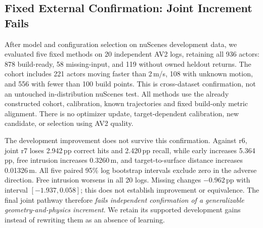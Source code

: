 \subsection{Fixed External Confirmation: Joint Increment Fails}
\label{sec:external}
After model and configuration selection on nuScenes development data, we evaluated five fixed methods on 20 independent AV2 logs, retaining all 936 actors: 878 build-ready, 58 missing-input, and 119 without owned heldout returns. The cohort includes 221 actors moving faster than 2\,m/s, 108 with unknown motion, and 556 with fewer than 100 build points. This is cross-dataset confirmation, not an untouched in-distribution nuScenes test. All methods use the already constructed cohort, calibration, known trajectories and fixed build-only metric alignment. There is no optimizer update, target-dependent calibration, new candidate, or selection using AV2 quality.

\begin{table}[t]
\centering\small
\caption{Final fixed AV2 actor confirmation, 20 equally weighted logs. Hit/early/miss/recall are percentages; free and distance are meters. All 936 actor entries remain in accounting, including missing inputs and undefined owned-return cases. Distance is directed and conditional, not dense ground-truth Chamfer. Joint r7 and LiDAR r6 share the surface and physical objective; the joint pathway also changes native seeds, DPT features and build-depth auxiliary supervision.}
\label{tab:external}
\end{table}
\begin{table}[t]
\centering\scriptsize
\caption{External Joint r7 minus matched LiDAR r6. Five adverse intervals exclude zero. The slight missing reduction is uncertain.}
\label{tab:external-pair}
\end{table}
The development improvement does not survive this confirmation. Against r6, joint r7 loses 2.942\,pp correct hits and 2.420\,pp recall, while early increases 5.364\,pp, free intrusion increases 0.3260\,m, and target-to-surface distance increases 0.01326\,m. All five paired 95\% log bootstrap intervals exclude zero in the adverse direction. Free intrusion worsens in all 20 logs. Missing changes $-0.962$\,pp with interval $[-1.937,0.058]$; this does not establish improvement or equivalence. The final joint pathway therefore \emph{fails independent confirmation of a generalizable geometry-and-physics increment}. We retain its supported development gains instead of rewriting them as an absence of learning.

